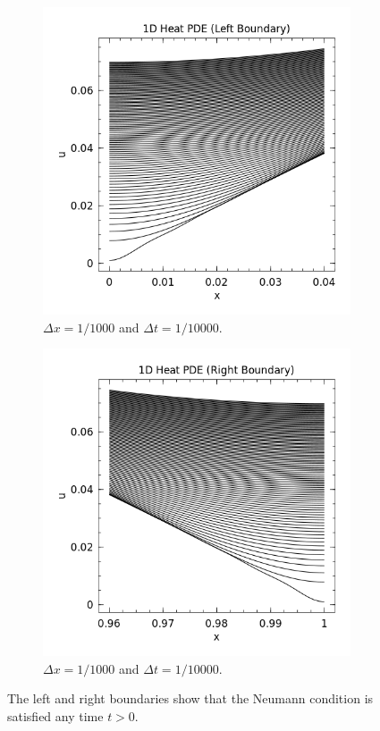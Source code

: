 \documentclass[10pt]{article}
\theoremstyle{remark}
\begin{document}
\begin{figure}[H]
	\centering
	\begin{subfigure}{.5\textwidth}
		\centering
		\includegraphics[width=0.8\linewidth]{1d_2.png}
		\caption{$\Delta x = 1/1000$ and $\Delta t = 1/10000$.}
		\label{fig:sub1}
	\end{subfigure}%
	\begin{subfigure}{.5\textwidth}
		\centering
		\includegraphics[width=0.8\linewidth]{1d_3.png}
		\caption{$\Delta x = 1/1000$ and $\Delta t = 1/10000$.}
		\label{fig:sub2}
	\end{subfigure}
	\caption{The left and right boundaries show that the Neumann condition is satisfied any time $t > 0$.}
	\label{fig:test}
\end{figure}  
\end{document}
